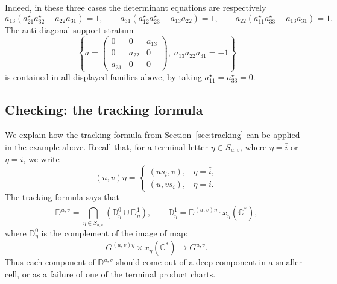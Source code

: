 \documentclass[12pt]{amsart}
\newcommand{\D}{\mathbb D}
\theoremstyle{plain}
\theoremstyle{definition}
\theoremstyle{remark}
\begin{document}
Indeed, in these three cases the determinant equations are respectively
\[
a_{13}(a_{21}^{\star}a_{32}^{\star}-a_{22}a_{31})=1,\qquad
a_{31}(a_{12}^{\star}a_{23}^{\star}-a_{13}a_{22})=1,\qquad
a_{22}(a_{11}^{\star}a_{33}^{\star}-a_{13}a_{31})=1.
\]
The anti-diagonal support stratum
\[
\left\{
a=\!\left(
\begin{array}{ccc}
0&0&a_{13}\\
0&a_{22}&0\\
a_{31}&0&0
\end{array}
\right)\!,\;a_{13}a_{22}a_{31}=-1
\right\}
\]
is contained in all
displayed families above, by taking \(a_{11}^{\star}=a_{33}^{\star}=0\).


\subsection{Checking: the tracking formula}

We explain how the tracking formula from
Section~\ref{sec:tracking} can be applied in the example above. Recall that, for a terminal letter $\eta \in S_{u,v}$,
where $\eta=\bar i$ or $\eta=i$, we write
\begin{equation*}
   (u,v)\eta =
   \begin{cases}
      (us_i,v),& \eta=\bar i,\\
      (u,vs_i),& \eta=i.
   \end{cases}
\end{equation*}
The tracking formula says that
\begin{equation*}
   \D^{u,v}
   =
   \bigcap_{\eta\in S_{u,v}}
   \left(\D^0_\eta\cup \D^1_\eta\right),
   \qquad
   \D^1_\eta=\overline{ \D^{(u,v)\eta}\cdot x_\eta(\mathbb C^\ast)},
\end{equation*}
where $\D^0_\eta$ is the complement of the image of map:
\begin{equation*}
   G^{(u,v)\eta}\times x_\eta(\mathbb C^\ast)\longrightarrow G^{u,v}.
\end{equation*}
Thus each component of $\D^{u,v}$ should come out of a
deep component in a smaller cell, or as a failure of one of the terminal product
charts.
\end{document}
